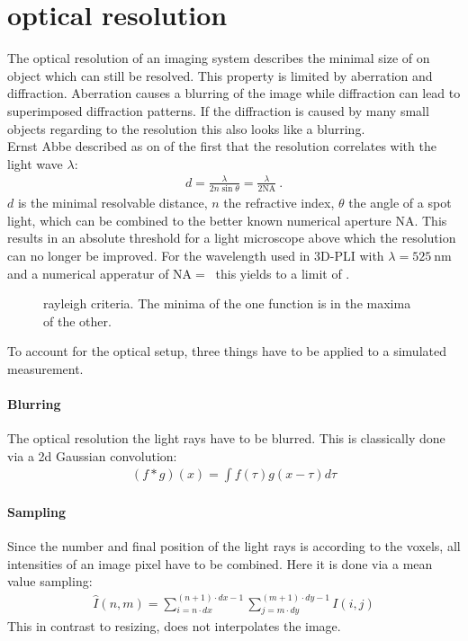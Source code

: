 \section{optical resolution}
\label{sec:opticalResolution}
% 
The optical resolution of an imaging system describes the minimal size of on object which can still be resolved.
This property is limited by aberration and diffraction.
Aberration causes a blurring of the image while diffraction can lead to superimposed diffraction patterns.
If the diffraction is caused by many small objects regarding to the resolution this also looks like a blurring.\\
Ernst Abbe described as on of the first that the resolution correlates with the light wave $\lambda$: 
\begin{align}
d=\frac{ \lambda}{2 n \sin \theta} = \frac{\lambda}{2\mathrm{NA}} \> .
\end{align}
$d$ is the minimal resolvable distance, $n$ the refractive index, $\theta$ the angle of a spot light, which can be combined to the better known numerical aperture $\mathrm{NA}$.
This results in an absolute threshold for a light microscope above which the resolution can no longer be improved.
For the wavelength used in \ac{3D-PLI} with $\lambda = \SI{525}{\nano\meter}$ and a numerical apperatur of $\mathrm{NA} = \SI{}{}$ this yields to a limit of \dummy{}.
% 
\begin{figure}[!t]
\setlength{\tikzwidth}{0.45\textwidth}
\centering
\caption[Raylay criterium]{rayleigh criteria. The minima of the one function is in the maxima of the other.}
\label{fig:rayleigh}
\end{figure}
% 
% 
To account for the optical setup, three things have to be applied to a simulated measurement.
% 
\paragraph{Blurring}
The optical resolution the light rays have to be blurred.
This is classically done via a 2d Gaussian convolution:
\begin{align}
    (f * g)(x) = \int f(\tau)g(x-\tau)d\tau
\end{align}
% 
\paragraph{Sampling}
Since the number and final position of the light rays is according to the voxels, all intensities of an image pixel have to be combined.
Here it is done via a mean value sampling:
\begin{align}
    \hat{I}(n,m) = \sum_{i=n \cdot dx}^{(n+1) \cdot dx-1}\sum_{j=m \cdot dy}^{(m+1) \cdot dy-1} I(i,j)
\end{align}
This in contrast to resizing, does not interpolates the image.
% 
